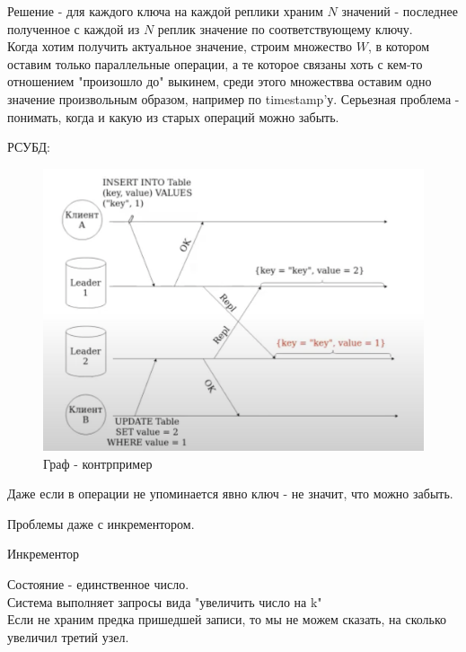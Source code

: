         Решение - для каждого ключа на каждой реплики храним $N$ значений - последнее полученное с каждой из $N$ реплик значение по соответствующему ключу. \\
        Когда хотим получить актуальное значение, строим множество $W$, в котором оставим только параллельные операции, а те которое связаны хоть с кем-то отношением "произошло до" выкинем, среди этого множествва оставим одно значение произвольным образом, например по timestamp'у.
    Серьезная проблема - понимать, когда и какую из старых операций можно забыть.\\
    \begin{example}
      РСУБД:\\
      \begin{figure}[h]
          \centering
          \includegraphics[scale = 0.5]{../assets/14.png}
          \caption{Граф - контрпример}
      \end{figure}
      Даже если в операции не упоминается явно ключ - не значит, что можно забыть.\\
    \end{example}
    Проблемы даже с инкрементором.\\
    \begin{definition}
    Инкрементор
    \end{definition}
      Состояние - единственное число.\\
      Система выполняет запросы вида "увеличить число на k"\\
      Если не храним предка пришедшей записи, то мы не можем сказать, на сколько увеличил третий узел.\\
